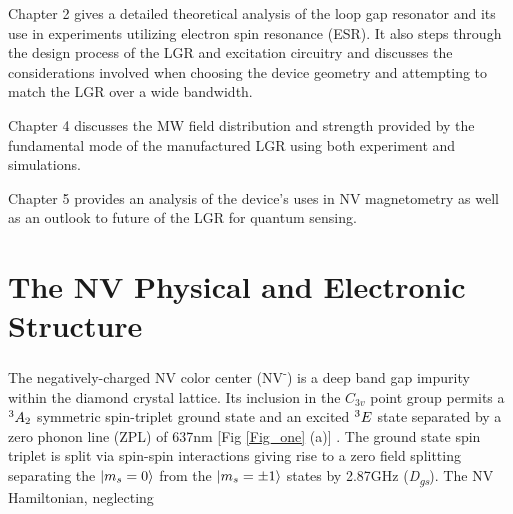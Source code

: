 Chapter 2 gives a detailed theoretical analysis of the loop gap resonator and its use in experiments utilizing electron spin resonance (ESR). It also steps through the design process of the LGR and excitation circuitry and discusses the considerations involved when choosing the device geometry and attempting to match the LGR over a wide bandwidth.


Chapter 4 discusses the MW field distribution and strength provided by the fundamental mode of the manufactured LGR using both experiment and simulations. 

Chapter 5 provides an analysis of the device's uses in NV magnetometry as well as an outlook to future of the LGR for quantum sensing.  


\section{The NV Physical and Electronic Structure} \label{sec:NVP}


The negatively-charged NV color center (NV\textsuperscript{-}) is a deep band gap impurity within the diamond crystal lattice. Its inclusion in the $C_{3v}$ point group permits a $\textsuperscript{3}A_2$ symmetric spin-triplet ground state and an excited $\textsuperscript{3}E$ state separated by a zero phonon line (ZPL) of 637nm [Fig \ref{Fig_one} (a)] \cite{maze2011properties}. The ground state spin triplet is split via spin-spin interactions giving rise to a zero field splitting separating the $\ket{m_s = 0}$ from the $\ket{m_s = \pm 1}$ states by 2.87GHz (\textit{D\textsubscript{gs}}). 
The NV Hamiltonian, neglecting 


